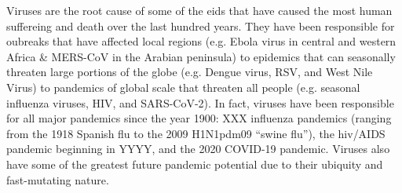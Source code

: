 Viruses are the root cause of some of the \gls{eid}s that have caused the most human suffereing and death over the last hundred years.
They have been responsible for oubreaks that have affected local regions (e.g. Ebola virus in central and western Africa \& MERS-CoV in the Arabian peninsula) to epidemics that can seasonally threaten large portions of the globe (e.g. Dengue virus, RSV, and West Nile Virus) to pandemics of global scale that threaten all people (e.g. seasonal influenza viruses, HIV, and SARS-CoV-2).
In fact, viruses have been responsible for all major pandemics since the year 1900: XXX influenza pandemics (ranging from the 1918 Spanish flu to the 2009 H1N1pdm09 ``swine flu''), the \gls{hiv}/AIDS pandemic beginning in YYYY, and the 2020 COVID-19 pandemic.
Viruses also have some of the greatest future pandemic potential due to their ubiquity and fast-mutating nature.

